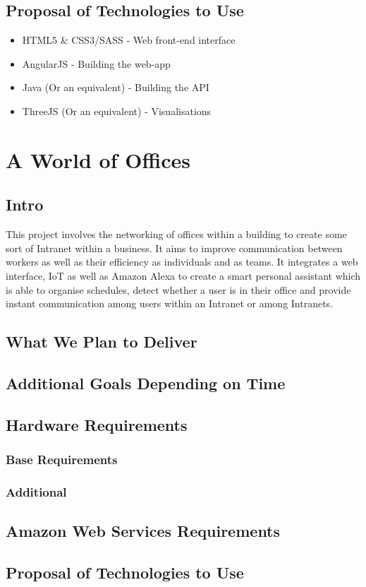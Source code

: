 \documentclass{article}
\begin{document}
	\subsection{Proposal of Technologies to Use}
		\begin{itemize}
			\item HTML5 \& CSS3/SASS - Web front-end interface
			\item AngularJS - Building the web-app
			\item Java (Or an equivalent) - Building the API
			\item ThreeJS (Or an equivalent) - Visualisations
		\end{itemize}
		
\cleardoublepage
	\section{A World of Offices}
	\subsection{Intro}
		This project involves the networking of offices within a building to create some sort of Intranet within a business. It aims to improve communication between workers as well as their efficiency as individuals and as teams. It integrates a web interface, IoT as well as Amazon Alexa to create a smart personal assistant which is able to organise schedules, detect whether a user is in their office and  provide instant communication among users within an Intranet or among Intranets.
	\subsection{What We Plan to Deliver}
	\subsection{Additional Goals Depending on Time}
	\subsection{Hardware Requirements}
		\subsubsection{Base Requirements}
		\subsubsection{Additional}
	\subsection{Amazon Web Services Requirements}
	\subsection{Proposal of Technologies to Use}
\end{document}
